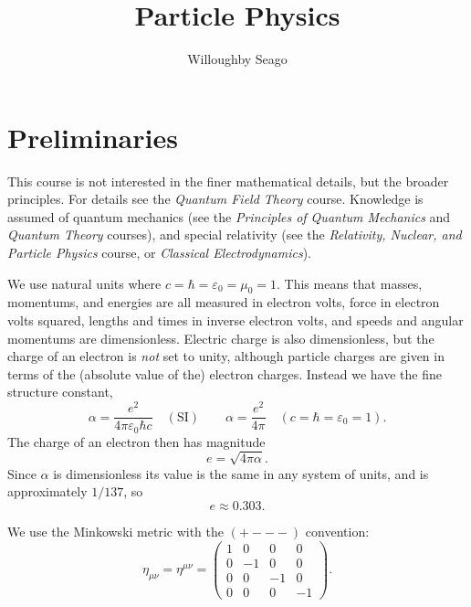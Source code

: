\documentclass[fleqn]{NotesClass}
\title{Particle Physics}
\author{Willoughby Seago}
\date{}
\newcommand{\course}[1]{\textit{#1}}
\begin{document}
    \frontmatter
    \titlepage
    \tableofcontents
    \listoffigures
    \mainmatter
    
    \chapter{Preliminaries}
    This course is not interested in the finer mathematical details, but the broader principles.
    For details see the \course{Quantum Field Theory} course.
    Knowledge is assumed of quantum mechanics (see the \course{Principles of Quantum Mechanics} and \course{Quantum Theory} courses), and special relativity (see the \course{Relativity, Nuclear, and Particle Physics} course, or \course{Classical Electrodynamics}).
    
    We use natural units where \(c = \hbar = \varepsilon_0 = \mu_0 = 1\).
    This means that masses, momentums, and energies are all measured in electron volts, force in electron volts squared, lengths and times in inverse electron volts, and speeds and angular momentums are dimensionless.
    Electric charge is also dimensionless, but the charge of an electron is  \emph{not} set to unity, although particle charges are given in terms of the (absolute value of the) electron charges.
    Instead we have the fine structure constant,
    \begin{equation}
        \alpha = \frac{e^2}{4\pi \varepsilon_0 \hbar c} \quad (\text{SI}) \qquad \alpha = \frac{e^2}{4\pi} \quad (c = \hbar = \varepsilon_0 = 1).
    \end{equation}
    The charge of an electron then has magnitude
    \begin{equation}
        e = \sqrt{4\pi \alpha}.
    \end{equation}
    Since \(\alpha\) is dimensionless its value is the same in any system of units, and is approximately \(1/137\), so
    \begin{equation}
        e \approx \num{0.303}.
    \end{equation}
    
    We use the Minkowski metric with the \(({+}{-}{-}{-})\) convention:
    \begin{equation}
        \eta_{\mu\nu} = \eta^{\mu\nu} = 
        \begin{pmatrix}
            1 & 0 & 0 & 0\\
            0 & -1 & 0 & 0\\
            0 & 0 & -1 & 0\\
            0 & 0 & 0 & -1
        \end{pmatrix}
        .
    \end{equation}
    
\end{document}
